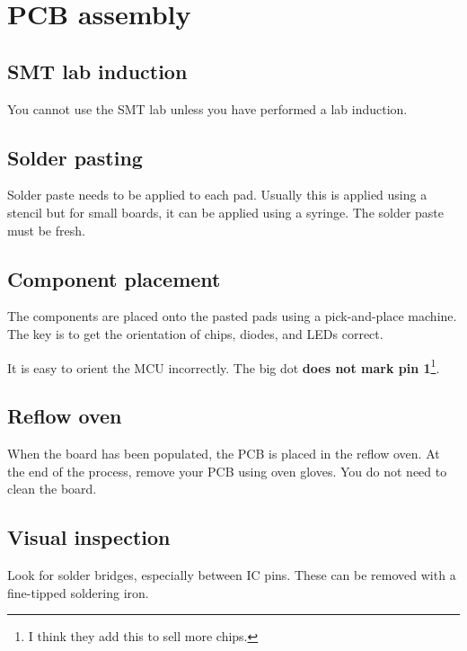 \chapter{PCB assembly}


\section{SMT lab induction}

You cannot use the SMT lab unless you have performed a lab induction.


\section{Solder pasting}

Solder paste needs to be applied to each pad.  Usually this is applied
using a stencil but for small boards, it can be applied using a
syringe.  The solder paste must be fresh.


\section{Component placement}

The components are placed onto the pasted pads using a pick-and-place
machine.  The key is to get the orientation of chips, diodes, and LEDs
correct.

It is easy to orient the MCU incorrectly.  The big dot \textbf{does
  not mark pin 1}\footnote{I think they add this to sell more chips.}.




\section{Reflow oven}

When the board has been populated, the PCB is placed in the reflow
oven.  At the end of the process, remove your PCB using oven gloves.
You do not need to clean the board.


\section{Visual inspection}

Look for solder bridges, especially between IC pins.  These can be
removed with a fine-tipped soldering iron.

